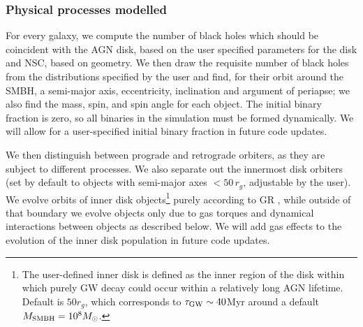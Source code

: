 \subsubsection{Physical processes modelled}

\label{sec:singlebh}
For every galaxy, we compute the number of black holes which should be coincident with the AGN disk, based on the user specified parameters for the disk and NSC, based on geometry.
We then draw the requisite number of black holes from the distributions specified by the user and find, for their orbit around the SMBH, a semi-major axis, eccentricity, inclination and argument of periapse; we also find the mass, spin, and spin angle for each object.
The initial binary fraction is zero, so all binaries in the simulation must be formed dynamically.
We will allow for a user-specified initial binary fraction in future code updates. 

We then distinguish between prograde and retrograde orbiters, as they are subject to different processes.
We also separate out the innermost disk orbiters (set by default to objects with semi-major axes $<50\,r_{g}$, adjustable by the user).
We evolve orbits of inner disk objects\footnote{The user-defined inner disk is defined as the inner region of the disk within which purely GW decay could occur within a relatively long AGN lifetime.
Default is $50r_{g}$, which corresponds to $\tau_{\rm GW} \sim 40$Myr around a default $M_{\rm SMBH}=10^{8}M_{\odot}$.} purely according to GR \citep[via the analytical formulae in][]{Peters64}, while outside of that boundary we evolve objects only due to gas torques and dynamical interactions between objects as described below.
We will add gas effects to the evolution of the inner disk population in future code updates.

